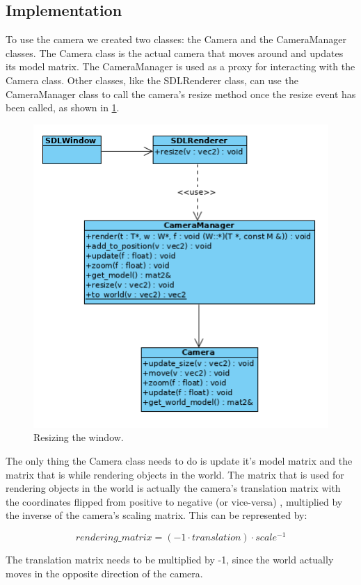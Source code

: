 \subsection{Implementation}
To use the camera we created two classes: the Camera and the CameraManager 
classes. The Camera class is the actual camera that moves around and updates 
its model matrix. The CameraManager is used as a proxy for interacting with 
the Camera class. Other classes, like the SDLRenderer class, can use the 
CameraManager class to call the camera's resize method once the resize event 
has been called, as shown in \cref{fig:renderer-resize}.

\begin{figure}[H]
    \centering
    \includegraphics[scale=0.75]{res/renderer-resize.png}
    \caption{Resizing the window.}\label{fig:renderer-resize}
\end{figure}

The only thing the Camera class needs to do is update it's model matrix and 
the matrix that is while rendering objects in the world. The matrix that is 
used for rendering objects in the world is actually the camera's translation 
matrix with the coordinates flipped from positive to negative (or vice-versa)
, multiplied by the inverse of the camera's scaling matrix.
This can be represented by:

$$ rendering\_matrix = (-1 \cdot translation) \cdot scale^{-1} $$

The translation matrix needs to be multiplied by -1, since the world actually 
moves in the opposite direction of the camera.

